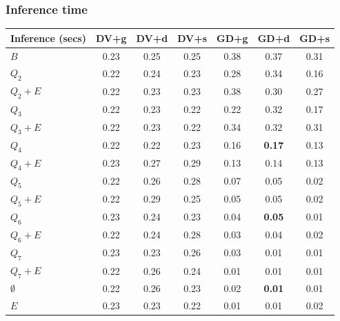 \documentclass{beamer}
\begin{document}
\begin{frame}
  \frametitle{Inference time}
  \footnotesize
  \begin{table}[h]
    \centering
    \begin{tabular}{l|c|c|c|c|c|c}
      \hline
      \multicolumn{1}{c}{\bfseries Inference (secs)} & \multicolumn{1}{c}{\bfseries DV+g} &
      \multicolumn{1}{c}{\bfseries DV+d} & \multicolumn{1}{c}{\bfseries DV+s} &
      \multicolumn{1}{c}{\bfseries GD+g} & \multicolumn{1}{c}{\bfseries GD+d} &
      \multicolumn{1}{c}{\bfseries GD+s}\\
      \hline
      $B$         & 0.23 & 0.25 & 0.25 & 0.38 & 0.37 & 0.31 \\
      $Q_2$       & 0.22 & 0.24 & 0.23 & 0.28 & 0.34 & 0.16 \\
      $Q_2+E$     & 0.22 & 0.23 & 0.23 & 0.38 & 0.30 & 0.27 \\
      $Q_3$       & 0.22 & 0.23 & 0.22 & 0.22 & 0.32 & 0.17 \\
      $Q_3+E$     & 0.22 & 0.23 & 0.22 & 0.34 & 0.32 & 0.31 \\
      $Q_4$       & 0.22 & 0.22 & 0.23 & 0.16 & \textbf{0.17} & 0.13 \\
      $Q_4+E$     & 0.23 & 0.27 & 0.29 & 0.13 & 0.14 & 0.13 \\
      $Q_5$       & 0.22 & 0.26 & 0.28 & 0.07 & 0.05 & 0.02 \\
      $Q_5+E$     & 0.22 & 0.29 & 0.25 & 0.05 & 0.05 & 0.02 \\
      $Q_6$       & 0.23 & 0.24 & 0.23 & 0.04 & \textbf{0.05} & 0.01 \\
      $Q_6+E$     & 0.22 & 0.24 & 0.28 & 0.03 & 0.04 & 0.02 \\
      $Q_7$       & 0.23 & 0.23 & 0.26 & 0.03 & 0.01 & 0.01 \\
      $Q_7+E$     & 0.22 & 0.26 & 0.24 & 0.01 & 0.01 & 0.01 \\
      $\emptyset$ & 0.22 & 0.26 & 0.23 & 0.02 & \textbf{0.01} & 0.01 \\
      $E$         & 0.23 & 0.23 & 0.22 & 0.01 & 0.01 & 0.02 \\
    \end{tabular}
  \end{table}
\end{frame}
\end{document}
